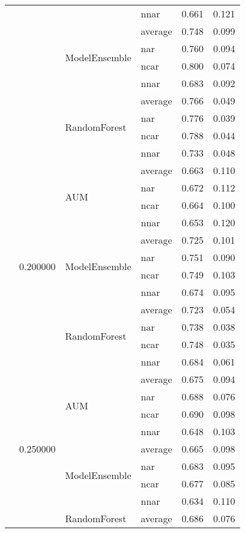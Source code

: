 \begin{longtable}{llllrr}
 &  &  & nnar & 0.661 & 0.121 \\
\cline{3-6}
 &  & \multirow[t]{4}{*}{ModelEnsemble} & average & 0.748 & 0.099 \\
 &  &  & nar & 0.760 & 0.094 \\
 &  &  & ncar & 0.800 & 0.074 \\
 &  &  & nnar & 0.683 & 0.092 \\
\cline{3-6}
 &  & \multirow[t]{4}{*}{RandomForest} & average & 0.766 & 0.049 \\
 &  &  & nar & 0.776 & 0.039 \\
 &  &  & ncar & 0.788 & 0.044 \\
 &  &  & nnar & 0.733 & 0.048 \\
\cline{2-6} \cline{3-6}
 & \multirow[t]{12}{*}{0.200000} & \multirow[t]{4}{*}{AUM} & average & 0.663 & 0.110 \\
 &  &  & nar & 0.672 & 0.112 \\
 &  &  & ncar & 0.664 & 0.100 \\
 &  &  & nnar & 0.653 & 0.120 \\
\cline{3-6}
 &  & \multirow[t]{4}{*}{ModelEnsemble} & average & 0.725 & 0.101 \\
 &  &  & nar & 0.751 & 0.090 \\
 &  &  & ncar & 0.749 & 0.103 \\
 &  &  & nnar & 0.674 & 0.095 \\
\cline{3-6}
 &  & \multirow[t]{4}{*}{RandomForest} & average & 0.723 & 0.054 \\
 &  &  & nar & 0.738 & 0.038 \\
 &  &  & ncar & 0.748 & 0.035 \\
 &  &  & nnar & 0.684 & 0.061 \\
\cline{2-6} \cline{3-6}
 & \multirow[t]{12}{*}{0.250000} & \multirow[t]{4}{*}{AUM} & average & 0.675 & 0.094 \\
 &  &  & nar & 0.688 & 0.076 \\
 &  &  & ncar & 0.690 & 0.098 \\
 &  &  & nnar & 0.648 & 0.103 \\
\cline{3-6}
 &  & \multirow[t]{4}{*}{ModelEnsemble} & average & 0.665 & 0.098 \\
 &  &  & nar & 0.683 & 0.095 \\
 &  &  & ncar & 0.677 & 0.085 \\
 &  &  & nnar & 0.634 & 0.110 \\
\cline{3-6}
 &  & \multirow[t]{4}{*}{RandomForest} & average & 0.686 & 0.076 \\

\end{longtable}

